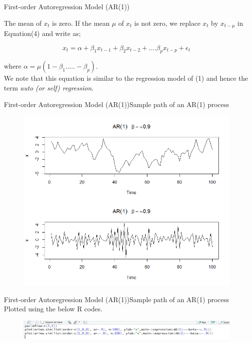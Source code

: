 \documentclass{beamer}
\begin{document}
\begin{frame}{First-order Autoregression Model (AR(1))} 

The mean of $ x_t $ is zero. If the mean $ \mu $ of $ x_t $ is not zero, we replace $ x_t $ by $ x_{t-\mu} $ in Equation(4) and write as; 	

\begin{equation}  
x_{t}=\alpha + \beta_{1}x_{t-1}+\beta_{2}x_{t-2}+ .... \beta_{p}x_{t-p}+ \epsilon_{t}  
\end{equation}

where $ \alpha = \mu(1-\beta_1.....- \beta_p) $. \\

We note that this equation is similar to the regression model of (1) and hence the term \textit{auto (or self) regression.}

\end{frame}	


\begin{frame}{First-order Autoregression Model (AR(1))}{Sample path of an AR(1) process}

\begin{figure}
\centering
\includegraphics[width=0.8\linewidth]{AR(1)}
\end{figure}

\end{frame}

\begin{frame}{First-order Autoregression Model (AR(1))}{Sample path of an AR(1) process}
Plotted using the below R codes. 

\begin{figure}
\centering
\includegraphics[width=\linewidth]{rcode2}
\end{figure}
	
\end{frame}	
\end{document}
